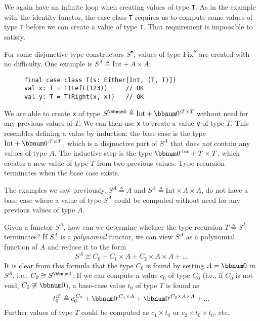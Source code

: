 \noindent We again have an infinite loop when creating values of type
\lstinline!T!. As in the example with the identity functor, the case
class \lstinline!T! requires us to compute some values of type \lstinline!T!
before we can create a value of type \lstinline!T!. That requirement
is impossible to satisfy.

For some disjunctive type constructors $S^{\bullet}$, values of type
$\text{Fix}^{S}$ are created with no difficulty. One example is $S^{A}\triangleq\text{Int}+A\times A$:

\begin{wrapfigure}{l}{0.46\columnwidth}%
\vspace{-0.75\baselineskip}
\begin{lstlisting}
final case class T(s: Either[Int, (T, T)])
val x: T = T(Left(123))     // OK
val y: T = T(Right(x, x))   // OK
\end{lstlisting}

\vspace{-1\baselineskip}
\end{wrapfigure}%

\noindent We are able to create \lstinline!x! of type $S^{\bbnum 0}\triangleq\text{Int}+\bbnum 0^{:T\times T}$
without need for any previous values of $T$. We can then use \lstinline!x!
to create a value \lstinline!y! of type $T$. This resembles defining
a value by induction: the base case is the type $\text{Int}+\bbnum 0^{:T\times T}$,
which is a disjunctive part of $S^{A}$ that does \emph{not} contain
any values of type $A$. The inductive step is the type $\bbnum 0^{:\text{Int}}+T\times T$,
which creates a new value of type $T$ from two previous values. Type
recursion terminates when the base case exists.

The examples we saw previously, $S^{A}\triangleq A$ and $S^{A}\triangleq\text{Int}\times A\times A$,
do not have a base case where a value of type $S^{A}$ could be computed
without need for any previous values of type $A$. 

Given a functor $S^{A}$, how can we determine whether the type recursion
$T\triangleq S^{T}$ terminates? If $S^{A}$ is a \emph{polynomial}
functor, we can view $S^{A}$ as a polynomial function of $A$ and
reduce it to the form 
\begin{equation}
S^{A}\cong C_{0}+C_{1}\times A+C_{2}\times A\times A+...\label{eq:functor-polynomial-normal-form}
\end{equation}
It is clear from this formula that the type $C_{0}$ is found by setting
$A=\bbnum 0$ in $S^{A}$, i.e., $C_{0}\cong S^{\bbnum 0}$. If we
can compute a value $c_{0}$ of type $C_{0}$ (i.e., if $C_{0}$ is
not void, $C_{0}\not\cong\bbnum 0$), a base-case value $t_{0}$ of
type $T$ is found as
\[
t_{0}^{:T}\triangleq c_{0}^{:C_{0}}+\bbnum 0^{:C_{1}\times A}+\bbnum 0^{:C_{2}\times A\times A}+...
\]
Further values of type $T$ could be computed as $c_{1}\times t_{0}$
or $c_{2}\times t_{0}\times t_{0}$, etc.

